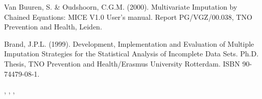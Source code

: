 \documentclass{article}
\begin{document}
\begin{References}\relax
Van Buuren, S. \& Oudshoorn, C.G.M. (2000). Multivariate Imputation by Chained Equations: 
MICE V1.0 User's manual. Report PG/VGZ/00.038, TNO Prevention and Health, Leiden.

Brand, J.P.L. (1999). Development, Implementation and Evaluation of Multiple Imputation Strategies for 
the Statistical Analysis of Incomplete Data Sets. Ph.D. Thesis, 
TNO Prevention and Health/Erasmus University Rotterdam. ISBN 90-74479-08-1.
\end{References}
\begin{SeeAlso}\relax
{}, , ,
\end{SeeAlso}
\end{document}
